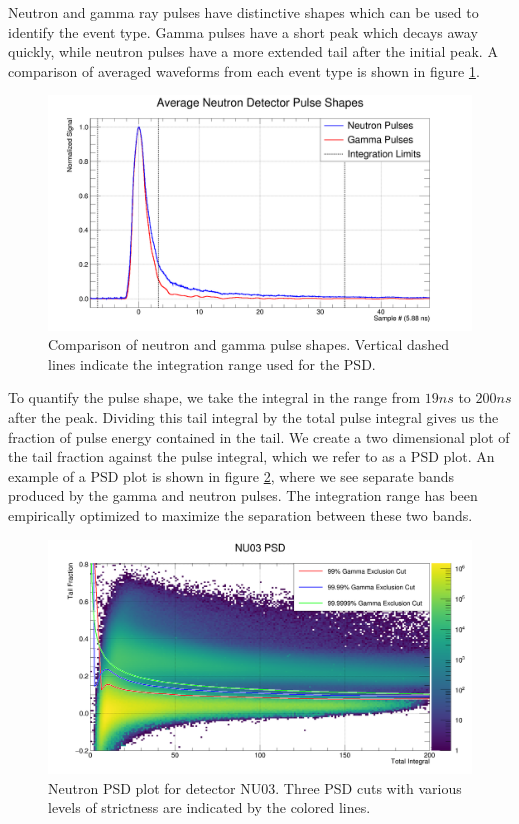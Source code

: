 Neutron and gamma ray pulses have distinctive shapes which can be used to identify the event type.
Gamma pulses have a short peak which decays away quickly, while neutron pulses have a more extended tail after the initial peak.
A comparison of averaged waveforms from each event type is shown in figure \ref{fig:neu_tail}.

\begin{figure}[h]
  \includegraphics[width=\textwidth]{software/figures/Neutron_Waveform_Averages.png}
  \caption{Comparison of neutron and gamma pulse shapes.  Vertical dashed lines indicate the integration range used for the PSD.}
  \label{fig:neu_tail}
\end{figure}

To quantify the pulse shape, we take the integral in the range from $19 ns$ to $200 ns$ after the peak.
Dividing this tail integral by the total pulse integral gives us the fraction of pulse energy contained in the tail.
We create a two dimensional plot of the tail fraction against the pulse integral, which we refer to as a PSD plot.
An example of a PSD plot is shown in figure \ref{fig:neu_psd}, where we see separate bands produced by the gamma and neutron pulses.
The integration range has been empirically optimized to maximize the separation between these two bands.

\begin{figure}[h]
  \includegraphics[width=\textwidth]{software/figures/Neutron_PSD.png}
  \caption{Neutron PSD plot for detector NU03.  Three PSD cuts with various levels of strictness are indicated by the colored lines.}
  \label{fig:neu_psd}
\end{figure}

